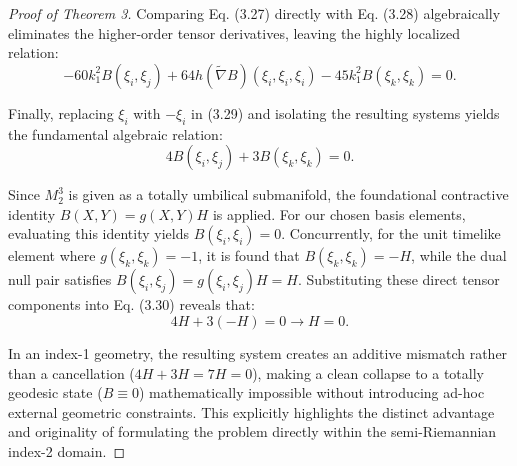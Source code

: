 \documentclass[10pt,a4paper]{amsart}
\begin{document}
\begin{proof}[Proof of Theorem 3]
Comparing Eq. (3.27) directly with Eq. (3.28) algebraically eliminates the higher-order tensor derivatives, leaving the highly localized relation:
\begin{equation}
-60k_1^2 B(\xi_i,\xi_j)+64h(\tilde{\nabla} B)(\xi_i,\xi_i,\xi_i)-45k_1^2 B(\xi_k,\xi_k)=0.
\end{equation}

Finally, replacing $\xi_i$ with $-\xi_i$ in (3.29) and isolating the resulting systems yields the fundamental algebraic relation:
\begin{equation}
4B(\xi_i,\xi_j)+3B(\xi_k,\xi_k)=0.
\end{equation}

Since $M_2^3$ is given as a totally umbilical submanifold, the foundational contractive identity $B(X,Y)=g(X,Y)H$ is applied. For our chosen basis elements, evaluating this identity yields $B(\xi_i,\xi_i)=0$. Concurrently, for the unit timelike element where $g(\xi_k,\xi_k)=-1$, it is found that $B(\xi_k,\xi_k)=-H$, while the dual null pair satisfies $B(\xi_i,\xi_j)=g(\xi_i,\xi_j)H=H$. Substituting these direct tensor components into Eq. (3.30) reveals that:
\[
4H+3(-H)=0 \rightarrow H=0.
\]

In an index-1 geometry, the resulting system creates an additive mismatch rather than a cancellation ($4H+3H=7H=0$), making a clean collapse to a totally geodesic state ($B \equiv 0$) mathematically impossible without introducing ad-hoc external geometric constraints. This explicitly highlights the distinct advantage and originality of formulating the problem directly within the semi-Riemannian index-2 domain.
\end{proof}
\end{document}
